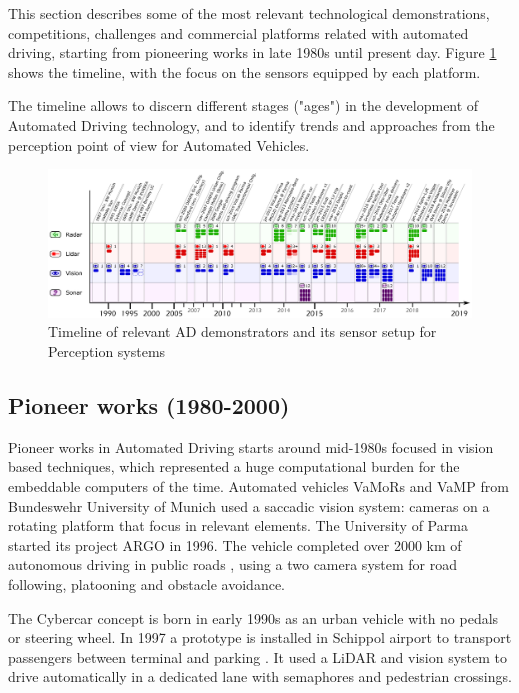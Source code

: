 This section describes some of the most relevant technological demonstrations, competitions, challenges and commercial platforms related with automated driving, starting from pioneering works in late 1980s until present day. Figure \ref{fig:tech-demos} shows the timeline, with the focus on the sensors equipped by each platform.

The timeline allows to discern different stages ("ages") in the development of Automated Driving technology, and to identify trends and approaches from the perception point of view for Automated Vehicles.

\begin{figure}[p] %
  \includegraphics[width=0.95\textheight,angle=90,keepaspectratio]{"img/AD_demos_Timeline"}
  \caption{Timeline of relevant AD demonstrators and its sensor setup for 
      Perception systems}
  \label{fig:tech-demos}
\end{figure}

\subsection{Pioneer works (1980-2000)}

Pioneer works in Automated Driving starts around mid-1980s focused in vision 
based techniques, which represented a huge computational burden for the
embeddable computers of the time. Automated vehicles VaMoRs 
\cite{Dickmanns1987} and VaMP \cite{Gregor2002} from Bundeswehr 
University of Munich used a saccadic vision system: cameras on a rotating 
platform that focus in relevant elements. 
The University of Parma started its project ARGO in 1996. %
The vehicle completed over 2000 km of autonomous driving in public roads 
\cite{Broggi1999}, using a two camera system for road following,
platooning and obstacle avoidance. 

The Cybercar concept is born in early 1990s \cite{Parent1993}
as an urban vehicle with no pedals or steering wheel. 
In 1997 a prototype is installed in Schippol airport to transport passengers 
between terminal and parking \cite{Ozguner2007}. It used a LiDAR and vision
system to drive automatically in a dedicated lane with semaphores and
pedestrian crossings.

